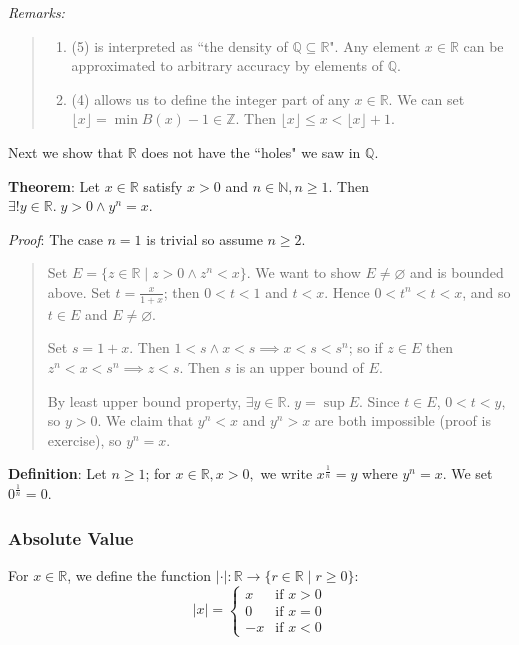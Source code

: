\documentclass[11pt]{article}
\begin{document}
\emph{Remarks:}
\begin{quote}\vspace{-0.3cm}
	\begin{enumerate}
	\item (5) is interpreted as ``the density of $\mathbb{Q} \subseteq \mathbb{R}$". Any element $x \in \mathbb{R}$ can be approximated to arbitrary accuracy by elements of $\mathbb{Q}$.
	\item (4) allows us to define the integer part of any $x \in \mathbb{R}$. We can set $\lfloor x \rfloor = \min B(x) - 1 \in \mathbb{Z}$. Then $\lfloor x \rfloor \leq x < \lfloor x \rfloor + 1$.
	\end{enumerate}
\end{quote}

Next we show that $\mathbb{R}$ does not have the ``holes" we saw in $\mathbb{Q}$.

\textbf{Theorem}: Let $x \in \mathbb{R}$ satisfy $x > 0$ and $n \in \mathbb{N}, n \geq 1$. Then $\exists ! y \in \mathbb{R}.\; y > 0 \land y^n = x$.

\emph{Proof}: The case $n = 1$ is trivial so assume $n \geq 2$.
\begin{quote}\vspace{-0.3cm}
Set $E = \{z \in \mathbb{R} \;|\; z > 0 \land z^n < x\}$. We want to show $E \neq \varnothing$ and is bounded above. Set $t = \frac{x}{1+x}$; then $0 < t < 1$ and $t < x$. Hence $0 < t^n < t < x$, and so $t \in E$ and $E \neq \varnothing$.

Set $s = 1+x$. Then $1 < s \land x < s \implies x < s < s^n$; so if $z \in E$ then $z^n < x < s^n \implies z < s$. Then $s$ is an upper bound of $E$.

By least upper bound property, $\exists y \in \mathbb{R}.\; y = \sup E$. Since $t \in E$, $0 < t < y$, so $y > 0$. We claim that $y^n < x$ and $y^n > x$ are both impossible (proof is exercise), so $y^n = x$.
\end{quote}

\textbf{Definition}: Let $n \geq 1$; for $x \in \mathbb{R}, x > 0,$ we write $x^{\frac{1}{n}} = y$ where $y^n = x$. We set $0^{\frac{1}{n}} = 0$.


\subsubsection{Absolute Value}

For $x \in \mathbb{R}$, we define the function $|\cdot| : \mathbb{R} \to \{r \in \mathbb{R} \;|\; r \geq 0\}$:
\[
 |x| =
  \begin{cases}
   x & \text{if } x > 0\\
   0 & \text{if } x = 0\\
  -x & \text{if } x < 0
  \end{cases}
\]
\end{document}
